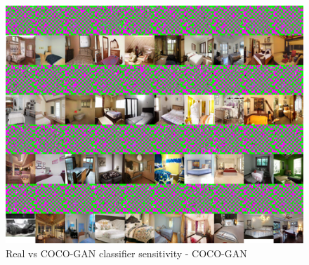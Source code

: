 \documentclass{article}
\begin{document}
    \begin{figure}[H]
      \centering
        \includegraphics[scale=.95]{smoothgrad-big/cocogan_model/testing-2-2-combined-dataset-cocogan-smoothgrad.png}
    \caption{Real vs COCO-GAN classifier sensitivity - COCO-GAN}
    \end{figure}
    
\end{document}
